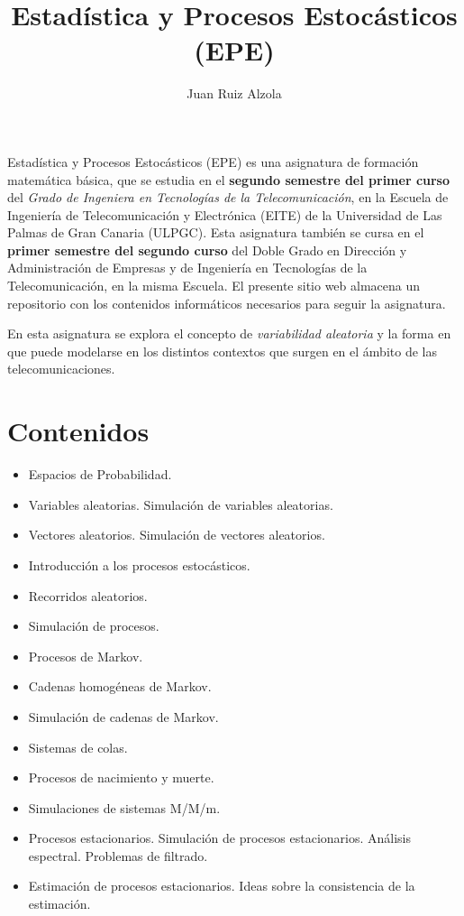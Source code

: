 \documentclass[11pt]{article}
\title{Estadística y Procesos Estocásticos (EPE)}
\author{Juan Ruiz Alzola}
\providecommand{\tightlist}{%
      \setlength{\itemsep}{0pt}\setlength{\parskip}{0pt}}
\begin{document}
    
    
    \maketitle
    
    

    

    Estadística y Procesos Estocásticos (EPE) es una asignatura de formación
matemática básica, que se estudia en el \textbf{segundo semestre del
primer curso} del \emph{Grado de Ingeniera en Tecnologías de la
Telecomunicación}, en la Escuela de Ingeniería de Telecomunicación y
Electrónica (EITE) de la Universidad de Las Palmas de Gran Canaria
(ULPGC). Esta asignatura también se cursa en el \textbf{primer semestre
del segundo curso} del Doble Grado en Dirección y Administración de
Empresas y de Ingeniería en Tecnologías de la Telecomunicación, en la
misma Escuela. El presente sitio web almacena un repositorio con los
contenidos informáticos necesarios para seguir la asignatura.

    En esta asignatura se explora el concepto de \emph{variabilidad
aleatoria} y la forma en que puede modelarse en los distintos contextos
que surgen en el ámbito de las telecomunicaciones.

    \hypertarget{contenidos}{%
\section{Contenidos}\label{contenidos}}

\begin{itemize}
\tightlist
\item
  Espacios de Probabilidad.
\item
  Variables aleatorias. Simulación de variables aleatorias.
\item
  Vectores aleatorios. Simulación de vectores aleatorios.
\item
  Introducción a los procesos estocásticos.
\item
  Recorridos aleatorios.
\item
  Simulación de procesos.
\item
  Procesos de Markov.
\item
  Cadenas homogéneas de Markov.
\item
  Simulación de cadenas de Markov.
\item
  Sistemas de colas.
\item
  Procesos de nacimiento y muerte.
\item
  Simulaciones de sistemas M/M/m.
\item
  Procesos estacionarios. Simulación de procesos estacionarios. Análisis
  espectral. Problemas de filtrado.
\item
  Estimación de procesos estacionarios. Ideas sobre la consistencia de
  la estimación.
\end{itemize}
\end{document}

